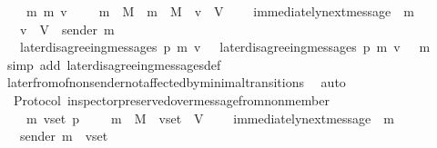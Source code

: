 \begin{isabellebody}
\ \ {\isachardoublequoteopen}{\isasymforall}\ {\isasymsigma}\ m\ m{\isacharprime}\ v{\isachardot}\ {\isasymsigma}\ {\isasymin}\ {\isasymSigma}\ {\isasymand}\ m\ {\isasymin}\ M\ {\isasymand}\ m{\isacharprime}\ {\isasymin}\ M\ {\isasymand}\ v\ {\isasymin}\ V\ \isanewline
\ \ {\isasymlongrightarrow}\ immediately{\isacharunderscore}next{\isacharunderscore}message\ {\isacharparenleft}{\isasymsigma}{\isacharcomma}\ m{\isacharprime}{\isacharparenright}\isanewline
\ \ {\isasymlongrightarrow}\ v\ {\isasymin}\ V\ {\isacharminus}\ {\isacharbraceleft}sender\ m{\isacharprime}{\isacharbraceright}\isanewline
\ \ {\isasymlongrightarrow}\ later{\isacharunderscore}disagreeing{\isacharunderscore}messages\ {\isacharparenleft}p{\isacharcomma}\ m{\isacharcomma}\ v{\isacharcomma}\ {\isasymsigma}{\isacharparenright}\ {\isacharequal}\ later{\isacharunderscore}disagreeing{\isacharunderscore}messages\ {\isacharparenleft}p{\isacharcomma}\ m{\isacharcomma}\ v{\isacharcomma}\ {\isasymsigma}\ {\isasymunion}\ {\isacharbraceleft}m{\isacharprime}{\isacharbraceright}{\isacharparenright}{\isachardoublequoteclose}\isanewline
%
\isadelimproof
\ \ %
\endisadelimproof
%
\isatagproof
{}\isamarkupfalse%
\ {\isacharparenleft}simp\ add{\isacharcolon}\ later{\isacharunderscore}disagreeing{\isacharunderscore}messages{\isacharunderscore}def{\isacharparenright}\isanewline
\ \ \isamarkupfalse%
\ later{\isacharunderscore}from{\isacharunderscore}of{\isacharunderscore}non{\isacharunderscore}sender{\isacharunderscore}not{\isacharunderscore}affected{\isacharunderscore}by{\isacharunderscore}minimal{\isacharunderscore}transitions\ \isamarkupfalse%
\ auto%
\endisatagproof
{\isafoldproof}%
%
\isadelimproof
\isanewline
%
\endisadelimproof
\isanewline
\isanewline
\isanewline
{}\isamarkupfalse%
\ {\isacharparenleft}\ Protocol{\isacharparenright}\ inspector{\isacharunderscore}preserved{\isacharunderscore}over{\isacharunderscore}message{\isacharunderscore}from{\isacharunderscore}non{\isacharunderscore}member\ {\isacharcolon}\isanewline
\ \ {\isachardoublequoteopen}{\isasymforall}\ {\isasymsigma}\ m\ v{\isacharunderscore}set\ p{\isachardot}\ {\isasymsigma}\ {\isasymin}\ {\isasymSigma}\ {\isasymand}\ m\ {\isasymin}\ M\ {\isasymand}\ v{\isacharunderscore}set\ {\isasymsubseteq}\ V\ \isanewline
\ \ {\isasymlongrightarrow}\ immediately{\isacharunderscore}next{\isacharunderscore}message\ {\isacharparenleft}{\isasymsigma}{\isacharcomma}\ m{\isacharparenright}\isanewline
\ \ {\isasymlongrightarrow}\ sender\ m\ {\isasymnotin}\ v{\isacharunderscore}set\isanewline

\end{isabellebody}
